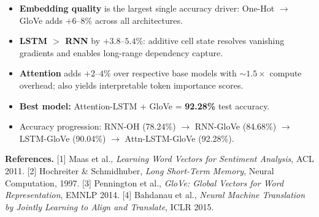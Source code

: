 \documentclass[10pt,a4paper,twocolumn]{article}
\begin{document}
\begin{resultbox}
\footnotesize
\begin{itemize}
  \item \textbf{Embedding quality} is the largest single accuracy driver:
        One-Hot $\to$ GloVe adds $+6$--$8\%$ across all architectures.
  \item \textbf{LSTM $>$ RNN} by $+3.8$--$5.4\%$: additive cell state
        resolves vanishing gradients and enables long-range dependency capture.
  \item \textbf{Attention} adds $+2$--$4\%$ over respective base models
        with ${\sim}1.5\times$ compute overhead; also yields interpretable
        token importance scores.
  \item \textbf{Best model:} Attention-LSTM + GloVe = \textbf{92.28\%} test accuracy.
  \item Accuracy progression: RNN-OH (78.24\%) $\to$ RNN-GloVe (84.68\%)
        $\to$ LSTM-GloVe (90.04\%) $\to$ Attn-LSTM-GloVe (92.28\%).
\end{itemize}
\end{resultbox}

\vspace{4pt}
\noindent\footnotesize
\textbf{References.}
[1] Maas et al., \textit{Learning Word Vectors for Sentiment Analysis}, ACL 2011.
[2] Hochreiter \& Schmidhuber, \textit{Long Short-Term Memory}, Neural Computation, 1997.
[3] Pennington et al., \textit{GloVe: Global Vectors for Word Representation}, EMNLP 2014.
[4] Bahdanau et al., \textit{Neural Machine Translation by Jointly Learning to Align and Translate}, ICLR 2015.
\end{document}
